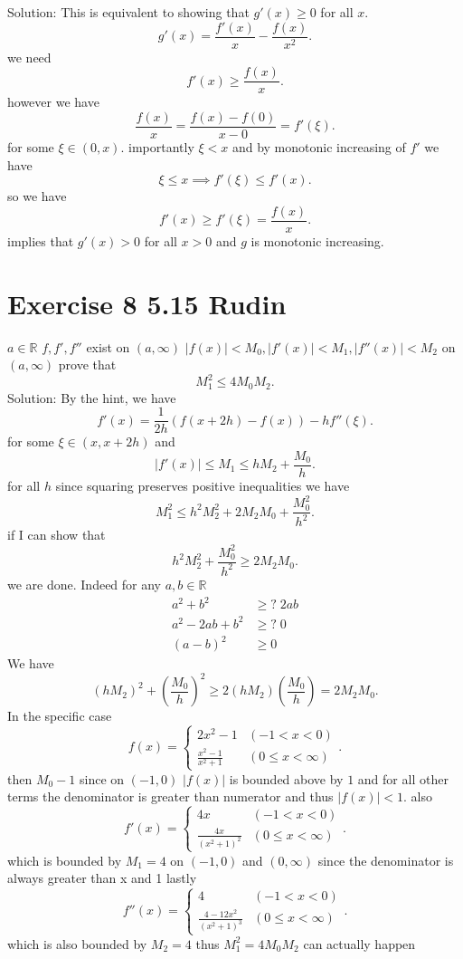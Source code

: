 \documentclass[11pt]{article}
\newcommand{\solution}[1]{{{\textcolor{header}{Solution:} \textcolor{solution}{#1}}}}
\begin{document}
\solution{
    This is equivalent to showing that $g'(x) \ge 0$ for all $x$.
    \[
    g'(x) = \frac{f'(x)}{x} - \frac{f(x)}{x^2}
    .\] 
    we need
    \[
    f'(x) \ge \frac{f(x)}{x}
    .\] 
    however we have
    \[
        \frac{f(x)}{x} = \frac{f(x)-f(0)}{x-0} = f'(\xi)
    .\] 
    for some $\xi \in (0,x)$. importantly  $\xi < x$ and by monotonic increasing of  $f'$ we have
    \[
    \xi \le x \implies f'(\xi) \le f'(x)
    .\] 
    so we have
    \[
    f'(x) \ge f'(\xi) = \frac{f(x)}{x}
    .\] 
    implies that $g'(x) > 0$ for all  $x > 0$ and  $g$ is monotonic increasing.
}

\section{Exercise 8 5.15 Rudin}
$a \in \mathbb{R}$ $f,f',f''$ exist on  $(a, \infty)$ $|f(x)| < M_0, |f'(x)| < M_1, |f''(x)| < M_2$ on $(a,\infty)$
prove that
\[
M_1^2 \le 4M_0M_2
.\] 
\solution{
    By the hint, we have
    \[
    f'(x) = \frac{1}{2h}(f(x+2h)-f(x)) - hf''(\xi)
    .\] 
    for some $\xi \in (x,x+2h)$
    and
     \[
    |f'(x)| \le M_1 \le hM_2 + \frac{M_0}{h}
    .\] 
    for all $h$
    since squaring preserves positive inequalities we have
    \[
    M_1^2 \le h^2 M_2^2 + 2M_2M_0 + \frac{M_0^2}{h^2}
    .\] 
    if I can show that
    \[
    h^2M_2^2 + \frac{M_0^2}{h^2} \ge 2M_2M_0
    .\] 
    we are done.
    Indeed for any $a,b \in \mathbb{R}$
    \begin{align*}
        a^2 + b^2 &\ge? \; 2ab\\
        a^2 - 2ab + b^2 &\ge? \; 0\\
        (a-b)^2 &\ge 0
    \end{align*}
    We have
    \[
        (hM_2)^2 + (\frac{M_0}{h})^2 \ge 2(hM_2)(\frac{M_0}{h}) = 2M_2M_0
    .\] 
    In the specific case
    \[
    f(x) = 
    \begin{cases}
        2x^2-1 & (-1 < x < 0)\\
        \frac{x^2-1}{x^2+1} & (0 \le x < \infty)
    \end{cases}
    .\] 
    then $M_0 - 1$ since on $(-1,0)$  $|f(x)|$ is bounded above by $1$ and for all other terms the denominator is greater than numerator and thus $|f(x)| < 1$.
    also
    \[
    f'(x) = 
    \begin{cases}
        4x & (-1 < x < 0)\\
        \frac{4x}{(x^2+1)^2} & (0 \le x < \infty)
    \end{cases}
    .\] 
    which is bounded by $M_1=4$ on $(-1,0)$ and  $(0,\infty)$ since the denominator is always greater than x and 1
    lastly
    \[
    f''(x) =
    \begin{cases}
        4 & (-1 < x < 0)\\
        \frac{4-12x^2}{(x^2+1)^{3}} & (0 \le x < \infty)
    \end{cases}
    .\] 
    which is also bounded by $M_2 = 4$ thus $M_1^2 =4M_0M_2$ can actually happen
}
\end{document}
